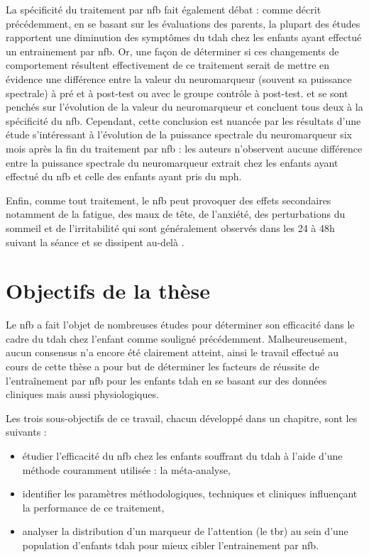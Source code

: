 La spécificité du traitement par \gls{nfb} fait également débat \citep{Ros2019, Schonenberg2017} : comme décrit précédemment, en se basant sur les évaluations des parents, 
la plupart des études rapportent une diminution des symptômes du \gls{tdah} chez les enfants ayant effectué un entrainement par \gls{nfb}. Or, 
une façon de déterminer si ces changements de comportement résultent
effectivement de ce traitement serait de mettre en évidence une différence entre la valeur du neuromarqueur (souvent sa puissance spectrale) à pré et à post-test ou avec
le groupe contrôle à post-test. 
\citet{Gevensleben2009eegeffects} et \citet{Janssen2016randomized} se sont penchés sur l'évolution de la valeur du neuromarqueur et concluent tous deux 
à la spécificité du \gls{nfb}. Cependant, cette conclusion est nuancée
par les résultats d'une étude s'intéressant à l'évolution de la puissance spectrale du neuromarqueur six mois après la fin du traitement par \gls{nfb} \citep{Janssen2020} : les auteurs
n'observent aucune différence entre la puissance spectrale du neuromarqueur extrait chez les enfants ayant effectué du \gls{nfb} et celle des enfants ayant pris du 
\gls{mph}.  

Enfin, comme tout traitement, le \gls{nfb} peut provoquer des effets secondaires notamment de la fatigue, des maux de tête, de l'anxiété, des perturbations du sommeil et de l'irritabilité qui
sont généralement observés dans les 24 à 48h suivant la séance et se dissipent au-delà \citep{Hammond2007}. 


\section{Objectifs de la thèse}

Le \gls{nfb} a fait l'objet de nombreuses études pour déterminer son efficacité dans le cadre du \gls{tdah} chez l'enfant comme souligné précédemment.
Malheureusement, aucun consensus n'a encore été clairement atteint, ainsi le travail effectué au cours de cette thèse a pour but de déterminer les facteurs 
de réussite de l'entraînement par \gls{nfb} pour les enfants \gls{tdah} en se basant sur des données cliniques mais aussi physiologiques. 

Les trois sous-objectifs de ce travail, chacun développé dans un chapitre, sont les suivants :
\begin{itemize}
\item étudier l'efficacité du \gls{nfb} chez les enfants souffrant du \gls{tdah} à l'aide d'une méthode couramment utilisée : la méta-analyse,
\item identifier les paramètres méthodologiques, techniques et cliniques influençant la performance de ce traitement,
\item analyser la distribution d'un marqueur de l'attention (le \gls{tbr}) au sein d'une population d'enfants \gls{tdah} pour mieux cibler
l'entrainement par \gls{nfb}. 
\end{itemize}

